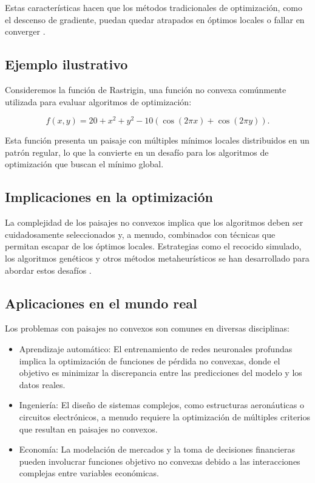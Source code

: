 Estas características hacen que los métodos tradicionales de optimización, como el descenso de gradiente, puedan quedar atrapados en óptimos locales o fallar en converger \cite{nocedal1999optimization}.

\subsection{Ejemplo ilustrativo}

Consideremos la función de Rastrigin, una función no convexa comúnmente utilizada para evaluar algoritmos de optimización:

\begin{equation}
	f(x, y) = 20 + x^2 + y^2 - 10 (\cos(2\pi x) + \cos(2\pi y)).
\end{equation}

Esta función presenta un paisaje con múltiples mínimos locales distribuidos en un patrón regular, lo que la convierte en un desafío para los algoritmos de optimización que buscan el mínimo global.

\subsection{Implicaciones en la optimización}

La complejidad de los paisajes no convexos implica que los algoritmos deben ser cuidadosamente seleccionados y, a menudo, combinados con técnicas que permitan escapar de los óptimos locales. Estrategias como el recocido simulado, los algoritmos genéticos y otros métodos metaheurísticos se han desarrollado para abordar estos desafíos \cite{statisticseasily}.

\subsection{Aplicaciones en el mundo real}

Los problemas con paisajes no convexos son comunes en diversas disciplinas:

\begin{itemize}
	\item Aprendizaje automático: El entrenamiento de redes neuronales profundas implica la optimización de funciones de pérdida no convexas, donde el objetivo es minimizar la discrepancia entre las predicciones del modelo y los datos reales.
	\item Ingeniería: El diseño de sistemas complejos, como estructuras aeronáuticas o circuitos electrónicos, a menudo requiere la optimización de múltiples criterios que resultan en paisajes no convexos.
	\item Economía: La modelación de mercados y la toma de decisiones financieras pueden involucrar funciones objetivo no convexas debido a las interacciones complejas entre variables económicas.
\end{itemize}

